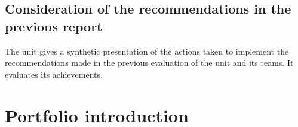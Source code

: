 \subsection{Consideration of the recommendations in the previous report%
}

\begin{hceresinstructions}
  The unit gives a synthetic presentation of the actions taken to
  implement the recommendations made in the previous evaluation of the
  unit and its teams. It evaluates its achievements.
\end{hceresinstructions}

\section{Portfolio introduction}


